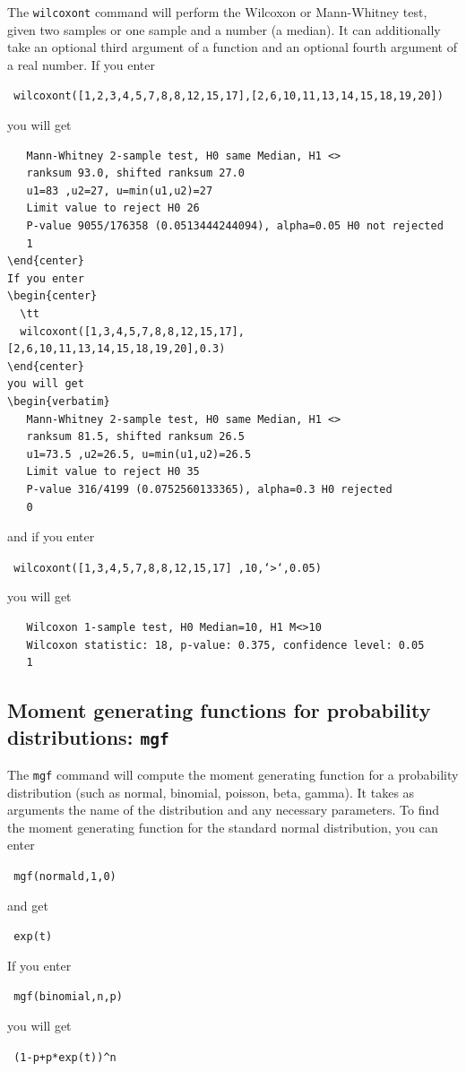 \documentclass[a4paper,11pt]{book}
\begin{document}
The \texttt{wilcoxont} command will perform the Wilcoxon or
Mann-Whitney test, given two samples or one sample and a number (a
median).  It can additionally take an optional third argument of a
function and an optional fourth argument of a real number.
If you enter
\begin{center}
  \tt
  wilcoxont([1,2,3,4,5,7,8,8,12,15,17],[2,6,10,11,13,14,15,18,19,20])
\end{center}
you will get
\begin{verbatim}
   Mann-Whitney 2-sample test, H0 same Median, H1 <>
   ranksum 93.0, shifted ranksum 27.0
   u1=83 ,u2=27, u=min(u1,u2)=27
   Limit value to reject H0 26
   P-value 9055/176358 (0.0513444244094), alpha=0.05 H0 not rejected 
   1
\end{center}
If you enter
\begin{center}
  \tt
  wilcoxont([1,3,4,5,7,8,8,12,15,17],[2,6,10,11,13,14,15,18,19,20],0.3)
\end{center}
you will get
\begin{verbatim}
   Mann-Whitney 2-sample test, H0 same Median, H1 <>
   ranksum 81.5, shifted ranksum 26.5
   u1=73.5 ,u2=26.5, u=min(u1,u2)=26.5
   Limit value to reject H0 35
   P-value 316/4199 (0.0752560133365), alpha=0.3 H0 rejected
   0
\end{verbatim}
and if you enter
\begin{center}
  \tt
  wilcoxont([1,3,4,5,7,8,8,12,15,17] ,10,`>`,0.05)
\end{center}
you will get
\begin{verbatim}
   Wilcoxon 1-sample test, H0 Median=10, H1 M<>10
   Wilcoxon statistic: 18, p-value: 0.375, confidence level: 0.05
   1
\end{verbatim}

\subsection{Moment generating functions for probability distributions: \texttt{mgf}}

The \texttt{mgf} command will compute the moment generating function
for a probability distribution (such as normal, binomial, poisson,
beta, gamma).  It takes as arguments the name of the distribution and
any necessary parameters.    To find the moment generating function
for the standard normal distribution, you can enter
\begin{center}
  \tt
  mgf(normald,1,0)
\end{center}
and get
\begin{center}
  \tt
  exp(t)
\end{center}
If you enter
\begin{center}
  \tt
  mgf(binomial,n,p)
\end{center}
you will get
\begin{center}
  \tt
  (1-p+p*exp(t))\^{}n
\end{center}
\end{document}
